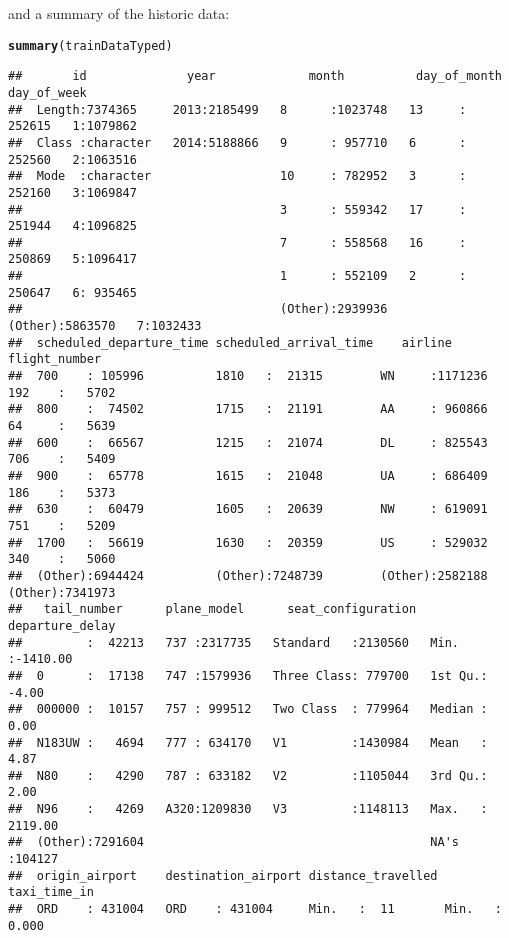 \documentclass{article}\usepackage[]{graphicx}\usepackage[]{color}
\makeatletter
\newcommand{\hlstd}[1]{\textcolor[rgb]{0.345,0.345,0.345}{#1}}%
\newcommand{\hlkwd}[1]{\textcolor[rgb]{0.737,0.353,0.396}{\textbf{#1}}}%
\newenvironment{kframe}{%
 \def\at@end@of@kframe{}%
 \ifinner\ifhmode%
  \def\at@end@of@kframe{\end{minipage}}%
  \begin{minipage}{\columnwidth}%
 \fi\fi%
 \def\FrameCommand##1{\hskip\@totalleftmargin \hskip-\fboxsep
 \colorbox{shadecolor}{##1}\hskip-\fboxsep
     \hskip-\linewidth \hskip-\@totalleftmargin \hskip\columnwidth}%
 \MakeFramed {\advance\hsize-\width
   \@totalleftmargin\z@ \linewidth\hsize
   \@setminipage}}%
 {\par\unskip\endMakeFramed%
 \at@end@of@kframe}
\newenvironment{knitrout}{}{} %
\makeatother
\begin{document}
and a summary of the historic data: 
\begin{knitrout}
\color{fgcolor}\begin{kframe}
\begin{alltt}
\hlkwd{summary}\hlstd{(trainDataTyped)}
\end{alltt}
\begin{verbatim}
##       id              year             month          day_of_month     day_of_week
##  Length:7374365     2013:2185499   8      :1023748   13     : 252615   1:1079862  
##  Class :character   2014:5188866   9      : 957710   6      : 252560   2:1063516  
##  Mode  :character                  10     : 782952   3      : 252160   3:1069847  
##                                    3      : 559342   17     : 251944   4:1096825  
##                                    7      : 558568   16     : 250869   5:1096417  
##                                    1      : 552109   2      : 250647   6: 935465  
##                                    (Other):2939936   (Other):5863570   7:1032433  
##  scheduled_departure_time scheduled_arrival_time    airline        flight_number    
##  700    : 105996          1810   :  21315        WN     :1171236   192    :   5702  
##  800    :  74502          1715   :  21191        AA     : 960866   64     :   5639  
##  600    :  66567          1215   :  21074        DL     : 825543   706    :   5409  
##  900    :  65778          1615   :  21048        UA     : 686409   186    :   5373  
##  630    :  60479          1605   :  20639        NW     : 619091   751    :   5209  
##  1700   :  56619          1630   :  20359        US     : 529032   340    :   5060  
##  (Other):6944424          (Other):7248739        (Other):2582188   (Other):7341973  
##   tail_number      plane_model      seat_configuration  departure_delay   
##         :  42213   737 :2317735   Standard   :2130560   Min.   :-1410.00  
##  0      :  17138   747 :1579936   Three Class: 779700   1st Qu.:   -4.00  
##  000000 :  10157   757 : 999512   Two Class  : 779964   Median :    0.00  
##  N183UW :   4694   777 : 634170   V1         :1430984   Mean   :    4.87  
##  N80    :   4290   787 : 633182   V2         :1105044   3rd Qu.:    2.00  
##  N96    :   4269   A320:1209830   V3         :1148113   Max.   : 2119.00  
##  (Other):7291604                                        NA's   :104127    
##  origin_airport    destination_airport distance_travelled  taxi_time_in     
##  ORD    : 431004   ORD    : 431004     Min.   :  11       Min.   :   0.000  

\end{verbatim}
\end{kframe}
\end{knitrout}
\end{document}
